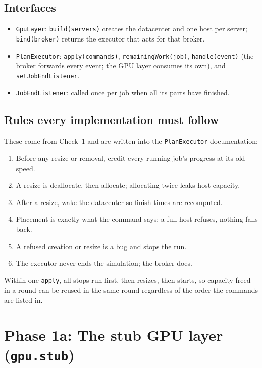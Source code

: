 \documentclass[11pt,a4paper]{article}
\newcommand{\code}[1]{\texttt{#1}}
\begin{document}
\subsection{Interfaces}
\begin{itemize}
  \item \code{GpuLayer}: \code{build(servers)} creates the datacenter and one host per server;
        \code{bind(broker)} returns the executor that acts for that broker.
  \item \code{PlanExecutor}: \code{apply(commands)}, \code{remainingWork(job)},
        \code{handle(event)} (the broker forwards every event; the GPU layer consumes its own),
        and \code{setJobEndListener}.
  \item \code{JobEndListener}: called once per job when all its parts have finished.
\end{itemize}

\subsection{Rules every implementation must follow}
These come from Check~1 and are written into the \code{PlanExecutor} documentation:

\begin{enumerate}
  \item Before any resize or removal, credit every running job's progress at its old speed.
  \item A resize is deallocate, then allocate; allocating twice leaks host capacity.
  \item After a resize, wake the datacenter so finish times are recomputed.
  \item Placement is exactly what the command says; a full host refuses, nothing falls back.
  \item A refused creation or resize is a bug and stops the run.
  \item The executor never ends the simulation; the broker does.
\end{enumerate}

Within one \code{apply}, all stops run first, then resizes, then starts, so capacity freed in a
round can be reused in the same round regardless of the order the commands are listed in.

\section{Phase 1a: The stub GPU layer (\code{gpu.stub})}
\end{document}
